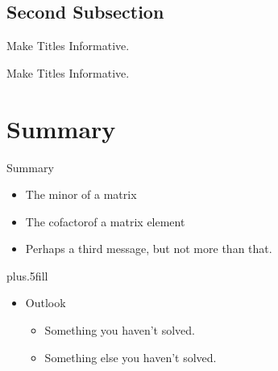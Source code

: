 \documentclass{beamer}
\begin{document}
\subsection{Second Subsection}
\begin{frame}{Make Titles Informative.}
\end{frame}

\begin{frame}{Make Titles Informative.}
\end{frame}



\section*{Summary}

\begin{frame}{Summary}

  \begin{itemize}
  \item
    The \alert{minor} of a matrix
  \item
    The \alert{cofactor}of a matrix element
  \item
    Perhaps a \alert{third message}, but not more than that.
  \end{itemize}
  
  \vskip0pt plus.5fill
  \begin{itemize}
  \item
    Outlook
    \begin{itemize}
    \item
      Something you haven't solved.
    \item
      Something else you haven't solved.
    \end{itemize}
  \end{itemize}
\end{frame}
\end{document}
